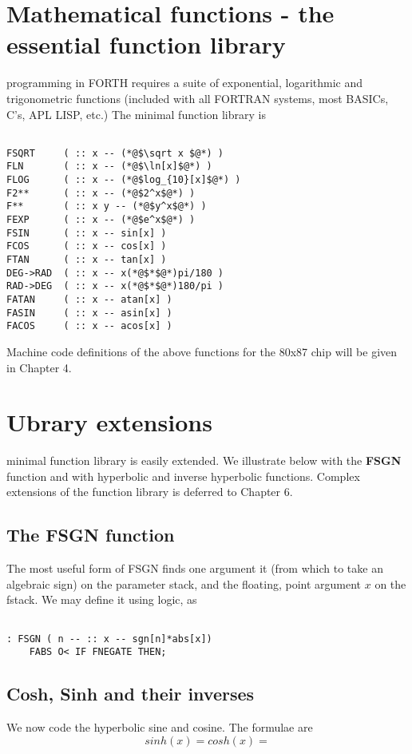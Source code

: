 \section{Mathematical functions - the essential function library}

 programming in FORTH requires a suite of exponential,
logarithmic and trigonometric functions (included with all
FORTRAN systems, most BASICs, C’s, APL LISP, etc.) The
minimal function library is

\begin{lstlisting}

FSQRT     ( :: x -- (*@$\sqrt x $@*) )
FLN       ( :: x -- (*@$\ln[x]$@*) )
FLOG      ( :: x -- (*@$log_{10}[x]$@*) )
F2**      ( :: x -- (*@$2^x$@*) )
F**       ( :: x y -- (*@$y^x$@*) )
FEXP      ( :: x -- (*@$e^x$@*) )
FSIN      ( :: x -- sin[x] )
FCOS      ( :: x -- cos[x] )
FTAN      ( :: x -- tan[x] )
DEG->RAD  ( :: x -- x(*@$*$@*)pi/180 )
RAD->DEG  ( :: x -- x(*@$*$@*)180/pi )
FATAN     ( :: x -- atan[x] )
FASIN     ( :: x -- asin[x] )
FACOS     ( :: x -- acos[x] )

\end{lstlisting}

Machine code definitions of the above functions for the 80x87
chip will be given in Chapter 4.

\section{Ubrary extensions}

 minimal function library is easily extended. We illustrate
below with the \textbf{FSGN} function and with hyperbolic and inverse hyperbolic
functions. Complex extensions of the function
library is deferred to Chapter 6.

\subsection{The FSGN function}
The most useful form of FSGN finds one argument it (from which
to take an algebraic sign) on the parameter stack, and the floating,
point argument $x$ on the fstack. We may define it using logic, as
\begin{verbatim}

: FSGN ( n -- :: x -- sgn[n]*abs[x])
	FABS O< IF FNEGATE THEN;
\end{verbatim}

\subsection{Cosh, Sinh and their inverses}
We now code the hyperbolic sine and cosine. The formulae are
\begin{equation}

sinh(x) = %

cosh(x) = %
\end{equation}


